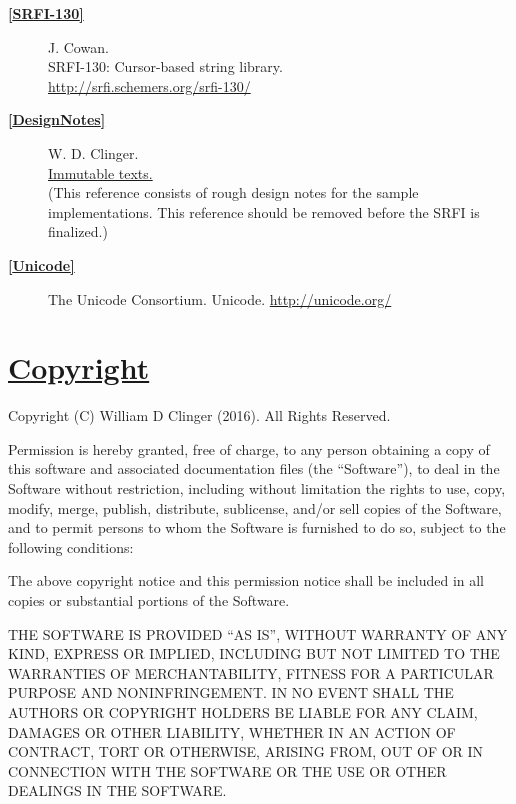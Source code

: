 \begin{description}
\item[\textbf{\href{}{{[}SRFI-130{]}}} ]
J. Cowan.\\
SRFI-130: Cursor-based string library.\\
\url{http://srfi.schemers.org/srfi-130/}
\item[\textbf{\href{}{{[}DesignNotes{]}}} ]
W. D. Clinger.\\
\href{https://github.com/larcenists/larceny/wiki/ImmutableTexts}{Immutable
texts.}\\
(This reference consists of rough design notes for the sample
implementations. This reference should be removed before the SRFI is
finalized.)
\item[\textbf{\href{}{{[}Unicode{]}}} ]
The Unicode Consortium. Unicode. \url{http://unicode.org/}
\end{description}

\section{\texorpdfstring{\href{}{Copyright}}{Copyright}}\label{copyright}

Copyright (C) William D Clinger (2016). All Rights Reserved.

Permission is hereby granted, free of charge, to any person obtaining a
copy of this software and associated documentation files (the
``Software''), to deal in the Software without restriction, including
without limitation the rights to use, copy, modify, merge, publish,
distribute, sublicense, and/or sell copies of the Software, and to
permit persons to whom the Software is furnished to do so, subject to
the following conditions:

The above copyright notice and this permission notice shall be included
in all copies or substantial portions of the Software.

THE SOFTWARE IS PROVIDED ``AS IS'', WITHOUT WARRANTY OF ANY KIND,
EXPRESS OR IMPLIED, INCLUDING BUT NOT LIMITED TO THE WARRANTIES OF
MERCHANTABILITY, FITNESS FOR A PARTICULAR PURPOSE AND NONINFRINGEMENT.
IN NO EVENT SHALL THE AUTHORS OR COPYRIGHT HOLDERS BE LIABLE FOR ANY
CLAIM, DAMAGES OR OTHER LIABILITY, WHETHER IN AN ACTION OF CONTRACT,
TORT OR OTHERWISE, ARISING FROM, OUT OF OR IN CONNECTION WITH THE
SOFTWARE OR THE USE OR OTHER DEALINGS IN THE SOFTWARE.
